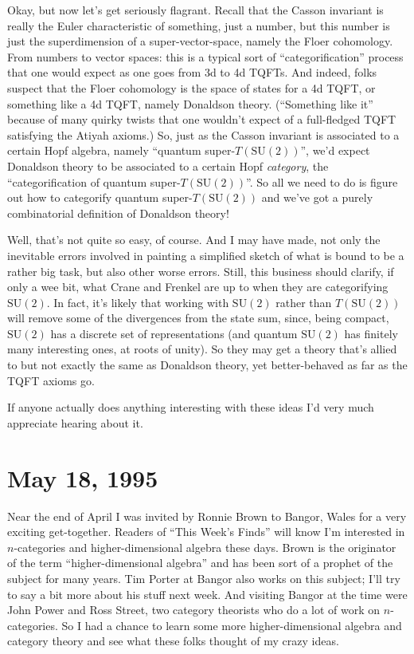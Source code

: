 \documentclass{article}
\begin{document}
Okay, but now let's get seriously flagrant. Recall that the Casson
invariant is really the Euler characteristic of something, just a
number, but this number is just the superdimension of a
super-vector-space, namely the Floer cohomology. From numbers to vector
spaces: this is a typical sort of ``categorification'' process that one
would expect as one goes from 3d to 4d TQFTs. And indeed, folks suspect
that the Floer cohomology is the space of states for a 4d TQFT, or
something like a 4d TQFT, namely Donaldson theory. (``Something like
it'' because of many quirky twists that one wouldn't expect of a
full-fledged TQFT satisfying the Atiyah axioms.) So, just as the Casson
invariant is associated to a certain Hopf algebra, namely ``quantum
super-\(T(\mathrm{SU}(2))\)'', we'd expect Donaldson theory to be
associated to a certain Hopf \emph{category}, the ``categorification of
quantum super-\(T(\mathrm{SU}(2))\)''. So all we need to do is figure
out how to categorify quantum super-\(T(\mathrm{SU}(2))\) and we've got
a purely combinatorial definition of Donaldson theory!

Well, that's not quite so easy, of course. And I may have made, not only
the inevitable errors involved in painting a simplified sketch of what
is bound to be a rather big task, but also other worse errors. Still,
this business should clarify, if only a wee bit, what Crane and Frenkel
are up to when they are categorifying \(\mathrm{SU}(2)\). In fact, it's
likely that working with \(\mathrm{SU}(2)\) rather than
\(T(\mathrm{SU}(2))\) will remove some of the divergences from the state
sum, since, being compact, \(\mathrm{SU}(2)\) has a discrete set of
representations (and quantum \(\mathrm{SU}(2)\) has finitely many
interesting ones, at roots of unity). So they may get a theory that's
allied to but not exactly the same as Donaldson theory, yet
better-behaved as far as the TQFT axioms go.

If anyone actually does anything interesting with these ideas I'd very
much appreciate hearing about it.



\hypertarget{week53}{%
\section{May 18, 1995}\label{week53}}

Near the end of April I was invited by Ronnie Brown to Bangor, Wales for
a very exciting get-together. Readers of ``This Week's Finds'' will know
I'm interested in \(n\)-categories and higher-dimensional algebra these
days. Brown is the originator of the term ``higher-dimensional algebra''
and has been sort of a prophet of the subject for many years. Tim Porter
at Bangor also works on this subject; I'll try to say a bit more about
his stuff next week. And visiting Bangor at the time were John Power and
Ross Street, two category theorists who do a lot of work on
\(n\)-categories. So I had a chance to learn some more
higher-dimensional algebra and category theory and see what these folks
thought of my crazy ideas.
\end{document}
